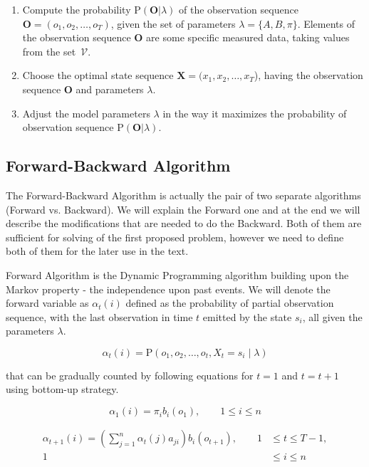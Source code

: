 \documentclass[thesis=M,english]{FITthesis}[2012/10/20]
\newcommand{\matr}[1]{\mathbf{#1}}
\begin{document}
\begin{enumerate}
\item Compute the probability $\mathrm{P}(\matr{O}|\lambda) $ of the observation sequence \\ $\matr{O} = (o_1,o_2,\dots,o_T)$, given the set of parameters $\lambda = \{A,B,\pi\}$. Elements of the observation sequence $\matr{O}$ are some specific measured data, taking values from the set~$\mathcal{V}$.   
\item Choose the optimal state sequence $\matr{X} = (x_1,x_2,\dots,x_T$), having the observation sequence $\matr{O}$ and parameters $\lambda$.
\item Adjust the model parameters $\lambda$ in the way it maximizes the probability of observation sequence $ \mathrm{P}(\matr{O}|\lambda) $. 
\end{enumerate}


\subsection{Forward-Backward Algorithm}\label{sec:fb}
The Forward-Backward Algorithm is actually the pair of two separate algorithms (Forward vs. Backward). We will explain the Forward one and at the end we will describe the modifications that are needed to do the Backward. Both of them are sufficient for solving of the first proposed problem, however we need to define both of them for the later use in the text.  

Forward Algorithm is the Dynamic Programming algorithm building upon the Markov property - the independence upon past events. We will denote the forward variable as $\alpha_t(i)$ defined as the probability of partial observation sequence, with the last observation in time $t$ emitted by the state $s_i$, all given the parameters $\lambda$.

\begin{equation}
\alpha_t(i) = \mathrm{P}(o_1,o_2,\dots,o_t,X_t = s_i \mid \lambda )
\end{equation}

that can be gradually counted by following equations for $t=1$ and $t=t+1$ using bottom-up strategy.

\begin{equation}
\alpha_1(i) = \pi_i b_i(o_1), \qquad 1 \leq i \leq n
\end{equation}

\begin{equation}
\begin{aligned}
\alpha_{t+1}(i) = \left( \sum_{j=1}^n \alpha_t(j) a_{ji} \right) b_i(o_{t+1}), \qquad 1& \leq t \leq T - 1, \\ 
                                                                                 1& \leq i \leq n		\end{aligned}
\end{equation}
\end{document}
